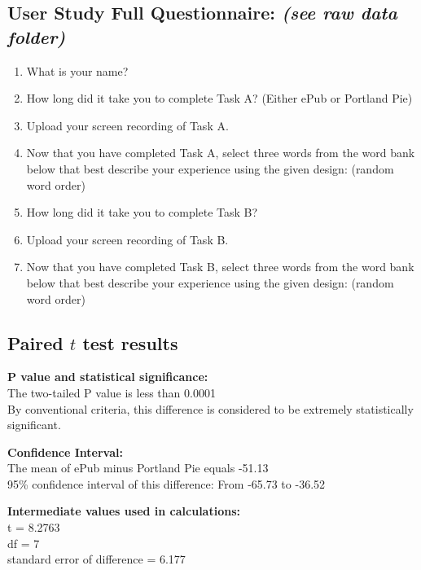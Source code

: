 \documentclass[runningheads]{llncs}
\begin{document}
\subsection{User Study Full Questionnaire: \textit{(see raw data folder)}}
\begin{flushleft}
\begin{enumerate}
    \item What is your name?
    \item How long did it take you to complete Task A? (Either ePub or Portland Pie)
    \item Upload your screen recording of Task A.
    \item Now that you have completed Task A, select three words from the word bank below that best describe your experience using the given design: (random word order)
    \item How long did it take you to complete Task B?
    \item Upload your screen recording of Task B.
    \item Now that you have completed Task B, select three words from the word bank below that best describe your experience using the given design: (random word order)
\end{enumerate}
\end{flushleft}

\subsection{Paired $t$ test results}
\begin{flushleft}
\textbf{P value and statistical significance:}\\
The two-tailed P value is less than 0.0001\\
By conventional criteria, this difference is considered to be extremely statistically significant. \newline

\textbf{Confidence Interval:}\\
The mean of ePub minus Portland Pie equals -51.13\\
95\% confidence interval of this difference: From -65.73 to -36.52 \newline

\textbf{Intermediate values used in calculations:}\\
t = 8.2763 \\
df = 7 \\
standard error of difference = 6.177
\end{flushleft}
\end{document}
